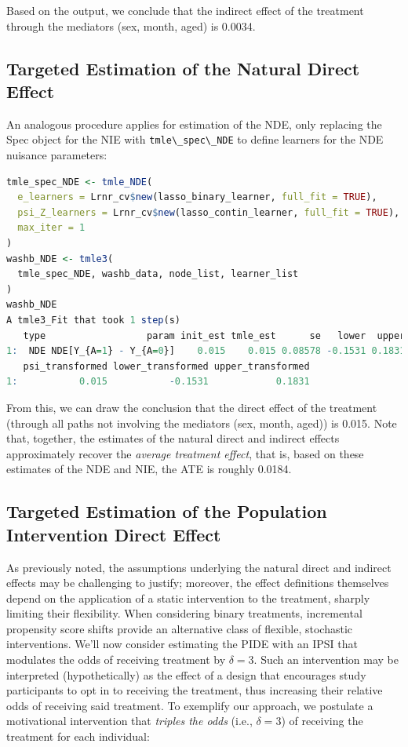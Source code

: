 \documentclass[
  12pt, krantz2,
]{krantz}
\newcommand{\passthrough}[1]{#1}
\newcommand{\1}{\mathbbm{1}}
\theoremstyle{definition}
\theoremstyle{definition}
\theoremstyle{definition}
\theoremstyle{definition}
\theoremstyle{remark}
\begin{document}
Based on the output, we conclude that the indirect effect of the treatment
through the mediators (sex, month, aged) is
0.0034.

\hypertarget{targeted-estimation-of-the-natural-direct-effect}{%
\subsection{Targeted Estimation of the Natural Direct Effect}\label{targeted-estimation-of-the-natural-direct-effect}}

An analogous procedure applies for estimation of the NDE, only replacing the
Spec object for the NIE with \passthrough{\lstinline!tmle\_spec\_NDE!} to define learners for the NDE
nuisance parameters:

\begin{lstlisting}[language=R]
tmle_spec_NDE <- tmle_NDE(
  e_learners = Lrnr_cv$new(lasso_binary_learner, full_fit = TRUE),
  psi_Z_learners = Lrnr_cv$new(lasso_contin_learner, full_fit = TRUE),
  max_iter = 1
)
washb_NDE <- tmle3(
  tmle_spec_NDE, washb_data, node_list, learner_list
)
washb_NDE
A tmle3_Fit that took 1 step(s)
   type                  param init_est tmle_est      se   lower  upper
1:  NDE NDE[Y_{A=1} - Y_{A=0}]    0.015    0.015 0.08578 -0.1531 0.1831
   psi_transformed lower_transformed upper_transformed
1:           0.015           -0.1531            0.1831
\end{lstlisting}

From this, we can draw the conclusion that the direct effect of the treatment
(through all paths not involving the mediators (sex, month, aged)) is
0.015. Note that, together, the estimates of
the natural direct and indirect effects approximately recover the \emph{average
treatment effect}, that is, based on these estimates of the NDE and NIE, the
ATE is roughly
0.0184.

\hypertarget{targeted-estimation-of-the-population-intervention-direct-effect}{%
\subsection{Targeted Estimation of the Population Intervention Direct Effect}\label{targeted-estimation-of-the-population-intervention-direct-effect}}

As previously noted, the assumptions underlying the natural direct and indirect
effects may be challenging to justify; moreover, the effect definitions
themselves depend on the application of a static intervention to the treatment,
sharply limiting their flexibility. When considering binary treatments,
incremental propensity score shifts provide an alternative class of flexible,
stochastic interventions. We'll now consider estimating the PIDE with an IPSI
that modulates the odds of receiving treatment by \(\delta = 3\). Such an
intervention may be interpreted (hypothetically) as the effect of a design that
encourages study participants to opt in to receiving the treatment, thus
increasing their relative odds of receiving said treatment. To exemplify our
approach, we postulate a motivational intervention that \emph{triples the odds}
(i.e., \(\delta = 3\)) of receiving the treatment for each individual:
\end{document}
